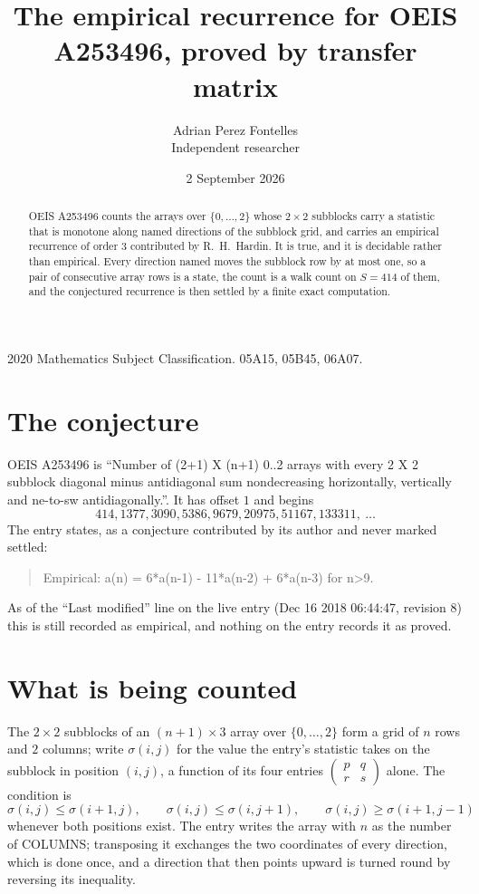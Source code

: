 \documentclass[11pt,a4paper]{article}
\title{The empirical recurrence for OEIS A253496, proved by transfer matrix}
\author{Adrian Perez Fontelles\\ \small Independent researcher}
\date{2 September 2026}
\theoremstyle{plain}
\theoremstyle{definition}
\begin{document}
\maketitle

\begin{abstract}
OEIS A253496 counts the arrays over $\{0,\dots,2\}$ whose $2\times2$ subblocks carry a
statistic that is monotone along named directions of the subblock grid, and carries an
empirical recurrence of order $3$ contributed by R.~H.~Hardin. It is true, and it is
decidable rather than empirical. Every direction named moves the subblock row by at most one,
so a pair of consecutive array rows is a state, the count is a walk count on $S=414$ of them,
and the conjectured recurrence is then settled by a finite exact computation.
\end{abstract}

\noindent\small 2020 Mathematics Subject Classification. 05A15, 05B45, 06A07.\normalsize

\section{The conjecture}

OEIS A253496 is ``Number of (2+1) X (n+1) 0..2 arrays with every 2 X 2 subblock diagonal minus antidiagonal sum nondecreasing horizontally, vertically and ne-to-sw antidiagonally.''. It has offset $1$ and begins
\[
414, 1377, 3090, 5386, 9679, 20975, 51167, 133311,\ \dots
\]
The entry states, as a conjecture contributed by its author and never marked settled:
\begin{quote}
Empirical: a(n) = 6*a(n-1) - 11*a(n-2) + 6*a(n-3) for n>9.
\end{quote}
As of the ``Last modified'' line on the live entry (Dec 16 2018 06:44:47, revision 8) this is still
recorded as empirical, and nothing on the entry records it as proved.

\section{What is being counted}

The $2\times2$ subblocks of an $(n+1)\times3$ array over $\{0,\dots,2\}$ form a grid
of $n$ rows and $2$ columns; write $\sigma(i,j)$ for the value the entry's statistic takes on
the subblock in position $(i,j)$, a function of its four entries
$\begin{pmatrix}p&q\\r&s\end{pmatrix}$ alone. The condition is
\[
\sigma(i,j)\le\sigma(i+1,j),\qquad \sigma(i,j)\le\sigma(i,j+1),\qquad \sigma(i,j)\ge\sigma(i+1,j-1)
\]
whenever both positions exist. The entry writes the array with $n$ as the number of COLUMNS; transposing it exchanges the two coordinates of every direction, which is done once, and a direction that then points upward is turned round by reversing its inequality.
\end{document}
